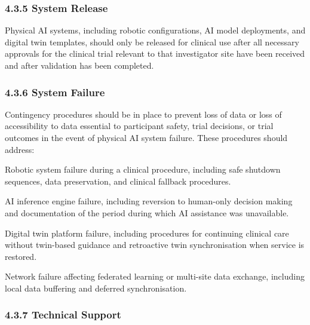 \documentclass[11pt]{article}
\begin{document}
\subsubsection{4.3.5 System Release}

Physical AI systems, including robotic configurations, AI model deployments, and digital twin templates, should only be released for clinical use after all necessary approvals for the clinical trial relevant to that investigator site have been received and after validation has been completed.

\subsubsection{4.3.6 System Failure}

Contingency procedures should be in place to prevent loss of data or loss of accessibility to data essential to participant safety, trial decisions, or trial outcomes in the event of physical AI system failure. These procedures should address:

\begin{description}[leftmargin=2.5cm,style=sameline]

\item[(a)] Robotic system failure during a clinical procedure, including safe shutdown sequences, data preservation, and clinical fallback procedures.

\item[(b)] AI inference engine failure, including reversion to human-only decision making and documentation of the period during which AI assistance was unavailable.

\item[(c)] Digital twin platform failure, including procedures for continuing clinical care without twin-based guidance and retroactive twin synchronisation when service is restored.

\item[(d)] Network failure affecting federated learning or multi-site data exchange, including local data buffering and deferred synchronisation.

\end{description}

\subsubsection{4.3.7 Technical Support}
\end{document}
